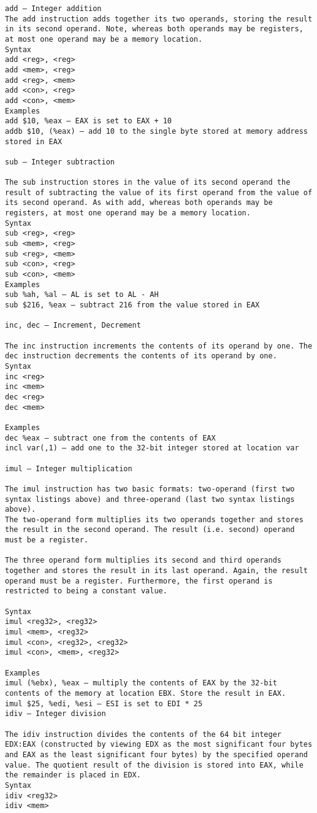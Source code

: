 \documentclass[10pt]{article}
\begin{document}
{\begin{multicols*}{5}
\begin{lstlisting}[breaklines=true,columns=fullflexible]
add — Integer addition
The add instruction adds together its two operands, storing the result in its second operand. Note, whereas both operands may be registers, at most one operand may be a memory location.
Syntax
add <reg>, <reg>
add <mem>, <reg>
add <reg>, <mem>
add <con>, <reg>
add <con>, <mem>
Examples
add $10, %eax — EAX is set to EAX + 10
addb $10, (%eax) — add 10 to the single byte stored at memory address stored in EAX

sub — Integer subtraction

The sub instruction stores in the value of its second operand the result of subtracting the value of its first operand from the value of its second operand. As with add, whereas both operands may be registers, at most one operand may be a memory location.
Syntax
sub <reg>, <reg>
sub <mem>, <reg>
sub <reg>, <mem>
sub <con>, <reg>
sub <con>, <mem>
Examples
sub %ah, %al — AL is set to AL - AH
sub $216, %eax — subtract 216 from the value stored in EAX

inc, dec — Increment, Decrement

The inc instruction increments the contents of its operand by one. The dec instruction decrements the contents of its operand by one.
Syntax
inc <reg>
inc <mem>
dec <reg>
dec <mem>

Examples
dec %eax — subtract one from the contents of EAX
incl var(,1) — add one to the 32-bit integer stored at location var

imul — Integer multiplication

The imul instruction has two basic formats: two-operand (first two syntax listings above) and three-operand (last two syntax listings above).
The two-operand form multiplies its two operands together and stores the result in the second operand. The result (i.e. second) operand must be a register.

The three operand form multiplies its second and third operands together and stores the result in its last operand. Again, the result operand must be a register. Furthermore, the first operand is restricted to being a constant value.

Syntax
imul <reg32>, <reg32>
imul <mem>, <reg32>
imul <con>, <reg32>, <reg32>
imul <con>, <mem>, <reg32>

Examples
imul (%ebx), %eax — multiply the contents of EAX by the 32-bit contents of the memory at location EBX. Store the result in EAX.
imul $25, %edi, %esi — ESI is set to EDI * 25
idiv — Integer division

The idiv instruction divides the contents of the 64 bit integer EDX:EAX (constructed by viewing EDX as the most significant four bytes and EAX as the least significant four bytes) by the specified operand value. The quotient result of the division is stored into EAX, while the remainder is placed in EDX.
Syntax
idiv <reg32>
idiv <mem>


\end{lstlisting}
\end{multicols*}}
\end{document}
